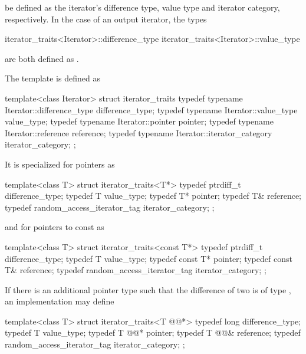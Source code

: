 be defined as the iterator's difference type, value type and iterator category, respectively.
In the case of an output iterator, the types

\begin{codeblock}
iterator_traits<Iterator>::difference_type
iterator_traits<Iterator>::value_type
\end{codeblock}

are both defined as .

\pnum
The template
is defined as

\begin{codeblock}
  template<class Iterator> struct iterator_traits {
    typedef typename Iterator::difference_type difference_type;
    typedef typename Iterator::value_type value_type;
    typedef typename Iterator::pointer pointer;
    typedef typename Iterator::reference reference;
    typedef typename Iterator::iterator_category iterator_category;
  };
\end{codeblock}

It is specialized for pointers as

\begin{codeblock}
  template<class T> struct iterator_traits<T*> {
    typedef ptrdiff_t difference_type;
    typedef T value_type;
    typedef T* pointer;
    typedef T& reference;
    typedef random_access_iterator_tag iterator_category;
  };
\end{codeblock}

and for pointers to const as

\begin{codeblock}
  template<class T> struct iterator_traits<const T*> {
    typedef ptrdiff_t difference_type;
    typedef T value_type;
    typedef const T* pointer;
    typedef const T& reference;
    typedef random_access_iterator_tag iterator_category;
  };
\end{codeblock}

\enternote
If there is an additional pointer type
such that the difference of two
is of type
,
an implementation may define

\begin{codeblock}
  template<class T> struct iterator_traits<T @@*> {
    typedef long difference_type;
    typedef T value_type;
    typedef T @@* pointer;
    typedef T @@& reference;
    typedef random_access_iterator_tag iterator_category;
  };
\end{codeblock}
\exitnoteb

